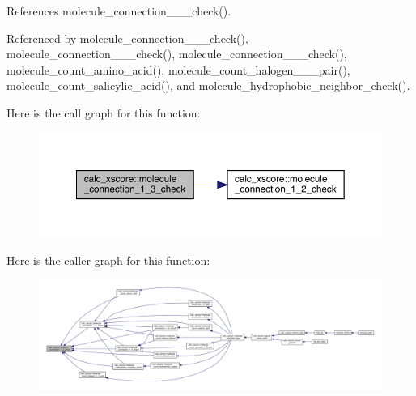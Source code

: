References molecule\-\_\-connection\-\_\-\_\-\_\-check().



Referenced by molecule\-\_\-connection\-\_\-\_\-\_\-check(), molecule\-\_\-connection\-\_\-\_\-\_\-check(), molecule\-\_\-connection\-\_\-\_\-\_\-check(), molecule\-\_\-count\-\_\-amino\-\_\-acid(), molecule\-\_\-count\-\_\-halogen\-\_\-\_\-\_\-pair(), molecule\-\_\-count\-\_\-salicylic\-\_\-acid(), and molecule\-\_\-hydrophobic\-\_\-neighbor\-\_\-check().



Here is the call graph for this function\-:
\nopagebreak
\begin{figure}[H]
\begin{center}
\leavevmode
\includegraphics[width=350pt]{classcalc__xscore_a9d9f27b4fed731d2a432dd7fb2e80b61_cgraph}
\end{center}
\end{figure}




Here is the caller graph for this function\-:
\nopagebreak
\begin{figure}[H]
\begin{center}
\leavevmode
\includegraphics[width=350pt]{classcalc__xscore_a9d9f27b4fed731d2a432dd7fb2e80b61_icgraph}
\end{center}
\end{figure}


